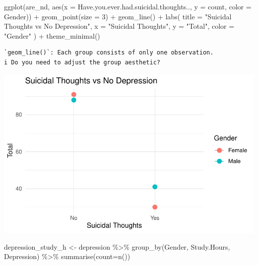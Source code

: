 \documentclass[
  letterpaper,
  DIV=11,
  numbers=noendperiod]{scrartcl}
\newenvironment{Shaded}{\begin{snugshade}}{\end{snugshade}}
\newcommand{\AttributeTok}[1]{\textcolor[rgb]{0.40,0.45,0.13}{#1}}
\newcommand{\DecValTok}[1]{\textcolor[rgb]{0.68,0.00,0.00}{#1}}
\newcommand{\FunctionTok}[1]{\textcolor[rgb]{0.28,0.35,0.67}{#1}}
\newcommand{\NormalTok}[1]{\textcolor[rgb]{0.00,0.23,0.31}{#1}}
\newcommand{\OtherTok}[1]{\textcolor[rgb]{0.00,0.23,0.31}{#1}}
\newcommand{\SpecialCharTok}[1]{\textcolor[rgb]{0.37,0.37,0.37}{#1}}
\newcommand{\StringTok}[1]{\textcolor[rgb]{0.13,0.47,0.30}{#1}}
\begin{document}
\begin{Shaded}
\begin{Highlighting}[]
\FunctionTok{ggplot}\NormalTok{(are\_nd, }\FunctionTok{aes}\NormalTok{(}\AttributeTok{x =}\NormalTok{ Have.you.ever.had.suicidal.thoughts.., }\AttributeTok{y =}\NormalTok{ count, }\AttributeTok{color =}\NormalTok{ Gender)) }\SpecialCharTok{+}
  \FunctionTok{geom\_point}\NormalTok{(}\AttributeTok{size =} \DecValTok{3}\NormalTok{) }\SpecialCharTok{+}    
  \FunctionTok{geom\_line}\NormalTok{() }\SpecialCharTok{+}       
  \FunctionTok{labs}\NormalTok{(}
    \AttributeTok{title =} \StringTok{"Suicidal Thoughts vs No Depression"}\NormalTok{,}
    \AttributeTok{x =} \StringTok{"Suicidal Thoughts"}\NormalTok{,}
    \AttributeTok{y =} \StringTok{"Total"}\NormalTok{,}
    \AttributeTok{color =} \StringTok{"Gender"}
\NormalTok{  ) }\SpecialCharTok{+}
  \FunctionTok{theme\_minimal}\NormalTok{() }
\end{Highlighting}
\end{Shaded}

\begin{verbatim}
`geom_line()`: Each group consists of only one observation.
i Do you need to adjust the group aesthetic?
\end{verbatim}

\includegraphics{Data_files/figure-pdf/unnamed-chunk-8-2.pdf}

\begin{Shaded}
\begin{Highlighting}[]
\NormalTok{depression\_study\_h }\OtherTok{\textless{}{-}}\NormalTok{ depression }\SpecialCharTok{\%\textgreater{}\%} \FunctionTok{group\_by}\NormalTok{(Gender, Study.Hours, Depression) }\SpecialCharTok{\%\textgreater{}\%} \FunctionTok{summarise}\NormalTok{(}\AttributeTok{count=}\FunctionTok{n}\NormalTok{())}
\end{Highlighting}
\end{Shaded}
\end{document}

